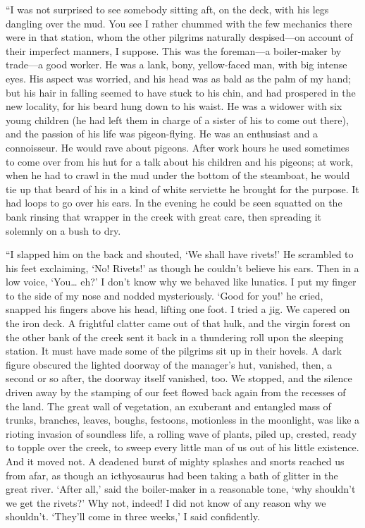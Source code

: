 \documentclass[12pt]{report}
\begin{document}
``I was not surprised to see somebody sitting aft, on the deck, with his
legs dangling over the mud. You see I rather chummed with the few
mechanics there were in that station, whom the other pilgrims naturally
despised---on account of their imperfect manners, I suppose. This was
the foreman---a boiler-maker by trade---a good worker. He was a lank,
bony, yellow-faced man, with big intense eyes. His aspect was worried,
and his head was as bald as the palm of my hand; but his hair in falling
seemed to have stuck to his chin, and had prospered in the new locality,
for his beard hung down to his waist. He was a widower with six young
children (he had left them in charge of a sister of his to come out
there), and the passion of his life was pigeon-flying. He was an
enthusiast and a connoisseur. He would rave about pigeons. After work
hours he used sometimes to come over from his hut for a talk about his
children and his pigeons; at work, when he had to crawl in the mud under
the bottom of the steamboat, he would tie up that beard of his in a kind
of white serviette he brought for the purpose. It had loops to go over
his ears. In the evening he could be seen squatted on the bank rinsing
that wrapper in the creek with great care, then spreading it solemnly on
a bush to dry.

``I slapped him on the back and shouted, `We shall have rivets!' He
scrambled to his feet exclaiming, `No! Rivets!' as though he couldn't
believe his ears. Then in a low voice, `You\ldots{} eh?' I don't know
why we behaved like lunatics. I put my finger to the side of my nose and
nodded mysteriously. `Good for you!' he cried, snapped his fingers above
his head, lifting one foot. I tried a jig. We capered on the iron deck.
A frightful clatter came out of that hulk, and the virgin forest on the
other bank of the creek sent it back in a thundering roll upon the
sleeping station. It must have made some of the pilgrims sit up in their
hovels. A dark figure obscured the lighted doorway of the manager's hut,
vanished, then, a second or so after, the doorway itself vanished, too.
We stopped, and the silence driven away by the stamping of our feet
flowed back again from the recesses of the land. The great wall of
vegetation, an exuberant and entangled mass of trunks, branches, leaves,
boughs, festoons, motionless in the moonlight, was like a rioting
invasion of soundless life, a rolling wave of plants, piled up, crested,
ready to topple over the creek, to sweep every little man of us out of
his little existence. And it moved not. A deadened burst of mighty
splashes and snorts reached us from afar, as though an icthyosaurus had
been taking a bath of glitter in the great river. `After all,' said the
boiler-maker in a reasonable tone, `why shouldn't we get the rivets?'
Why not, indeed! I did not know of any reason why we shouldn't. `They'll
come in three weeks,' I said confidently.
\end{document}
